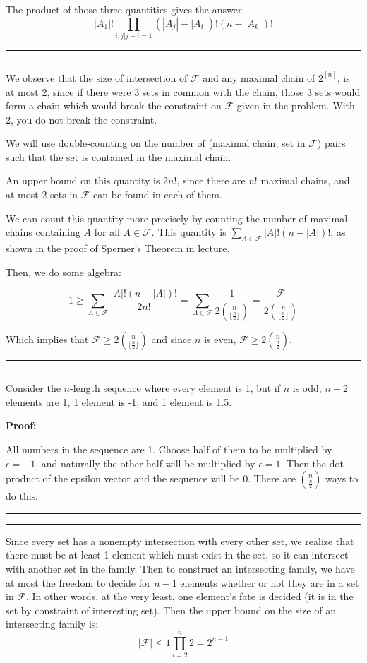 \documentclass[11pt,letterpaper]{article}
\newcommand{\question}[1] {\vspace{.25in} \hrule\vspace{0.5em}
\noindent{\bf #1} \vspace{0.5em}
\hrule \vspace{.10in}}
\begin{document}
The product of those three quantities gives the answer:
$$|A_1|!\prod_{i,j | j-i = 1} (|A_j| - |A_i|)!(n - |A_k|)!$$

\question{2}
We observe that the size of intersection of $\mathcal{F}$ and any maximal chain of $2^{[n]}$,
is at most 2, since if there were 3 sets in common with the chain,
those 3 sets would form a chain which would break the constraint on $\mathcal{F}$ given in the problem.
With 2, you do not break the constraint.

We will use double-counting on the number of (maximal chain, set in $\mathcal{F}$) pairs such that the set is contained in the maximal chain.

An upper bound on this quantity is $2n!$, since there are $n!$ maximal chains, and at most 2 sets in $\mathcal{F}$ can be found in each of them.

We can count this quantity more precisely by counting the number of maximal chains containing $A$ for all $A \in \mathcal{F}$.
This quantity is $\sum_{A \in \mathcal{F}} |A|!(n-|A|)!$, as shown in the proof of Sperner's Theorem in lecture.

Then, we do some algebra:

$$ 1 \geq \sum_{A \in \mathcal{F}} \frac{|A|!(n-|A|)!}{2n!} = \sum_{A \in \mathcal{F}} \frac{1}{2{n \choose \lfloor \frac{n}{2} \rfloor }} = \frac{\mathcal{F}}{2{n \choose \lfloor \frac{n}{2} \rfloor }}$$

Which implies that $\mathcal{F} \geq 2{n \choose \lfloor \frac{n}{2} \rfloor }$ and since $n$ is even, $\mathcal{F} \geq 2{n \choose \frac{n}{2}}$.


\question{3}
Consider the $n$-length sequence where every element is 1, but if $n$ is odd, $n-2$ elements are 1, 1 element is -1, and 1 element is 1.5.

\textbf{Proof:}

All numbers in the sequence are 1. Choose half of them to be multiplied by $\epsilon = -1$, and naturally the other half will be multiplied by $\epsilon = 1$.
Then the dot product of the epsilon vector and the sequence will be $0$. There are ${n \choose \frac{n}{2}}$ ways to do this.


\question{4}
Since every set has a nonempty intersection with every other set, we realize that there must be at least 1 element which must exist in the set, so it can intersect with another set in the family.
Then to construct an intersecting family, we have at most the freedom to decide for $n-1$ elements whether or not they are in a set in $\mathcal{F}$. In other words, at the very least, one element's fate is decided (it is in the set by constraint of interesting set).
Then the upper bound on the size of an intersecting family is:
$$ |\mathcal{F}| \leq 1 \prod_{i=2}^{n} 2 = 2^{n-1}$$
\end{document}

